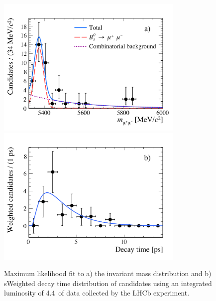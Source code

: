 \begin{figure}[tbp]
    \centering
          \includegraphics[width= 0.8\textwidth]{./Figs/LifetimeMeasurement/lifetime_mass_results.pdf}
            \includegraphics[width=0.8\textwidth]{./Figs/LifetimeMeasurement/lifetime_results.pdf}

    \caption{Maximum likelihood fit to a) the invariant mass distribution and b) sWeighted decay time distribution of \bsmumu candidates using an integrated luminosity of 4.4~\fb of data collected by the LHCb experiment.}
    \label{fig:ELresults}
\end{figure}



